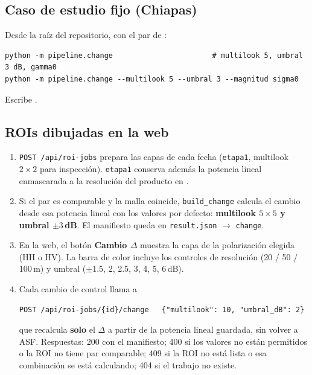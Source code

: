 \documentclass[11pt,a4paper]{article}
\begin{document}
\subsection{Caso de estudio fijo (Chiapas)}

Desde la raíz del repositorio, con el par de :
\begin{lstlisting}
python -m pipeline.change                       # multilook 5, umbral 3 dB, gamma0
python -m pipeline.change --multilook 5 --umbral 3 --magnitud sigma0
\end{lstlisting}
Escribe .

\subsection{ROIs dibujadas en la web}

\begin{enumerate}
  \item \texttt{POST /api/roi-jobs} prepara las capas de cada fecha (\texttt{etapa1}, multilook
        $2\times 2$ para inspección). \texttt{etapa1} conserva además la potencia lineal enmascarada
        a la resolución del producto en .
  \item Si el par es comparable y la malla coincide, \texttt{build\_change} calcula el cambio desde
        esa potencia lineal con los valores por defecto: \textbf{multilook $5\times 5$ y umbral
        $\pm 3$\,dB}. El manifiesto queda en \texttt{result.json} $\rightarrow$ \texttt{change}.
  \item En la web, el botón \textbf{Cambio $\Delta$} muestra la capa de la polarización elegida (HH o
        HV). La barra de color incluye los controles de resolución (20 / 50 / 100\,m) y umbral
        ($\pm$1.5, 2, 2.5, 3, 4, 5, 6\,dB).
  \item Cada cambio de control llama a
\begin{lstlisting}
POST /api/roi-jobs/{id}/change   {"multilook": 10, "umbral_dB": 2}
\end{lstlisting}
        que recalcula \textbf{solo} el $\Delta$ a partir de la potencia lineal guardada, sin volver a
        ASF. Respuestas: 200 con el manifiesto; 400 si los valores no están permitidos o la ROI no
        tiene par comparable; 409 si la ROI no está lista o esa combinación se está calculando; 404
        si el trabajo no existe.
\end{enumerate}
\end{document}
